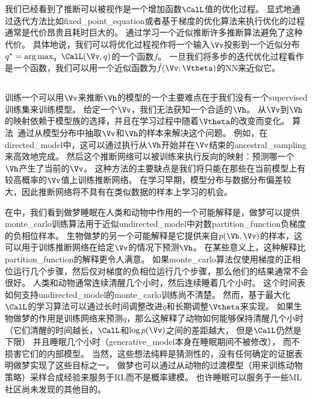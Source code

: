 \section{}
\label{sec:learned_approximate_inference}

我们已经看到了推断可以被视作是一个增加函数$\CalL$值的优化过程。
显式地通过迭代方法比如\gls{fixed_point_equation}或者基于梯度的优化算法来执行优化的过程通常是代价昂贵且耗时巨大的。
通过学习一个近似推断许多推断算法避免了这种代价。
具体地说，我们可以将优化过程视作将一个输入$\Vv$投影到一个近似分布$q^* = \arg\max_q\  \CalL(\Vv,q)$的一个函数$f$。
一旦我们将多步的迭代优化过程看作是一个函数，我们可以用一个近似函数为$\hat{f}(\Vv;{\Vtheta})$的\gls{NN}来近似它。


\subsection{}
\label{sec:wake_sleep}

训练一个可以用$\Vv$来推断$\Vh$的模型的一个主要难点在于我们没有一个\gls{supervised}训练集来训练模型。
给定一个$\Vv$，我们无法获知一个合适的$\Vh$。
从$\Vv$到$\Vh$的映射依赖于模型族的选择，并且在学习过程中随着${\Vtheta}$的改变而变化。
算法~\citep{Hinton95,Frey96}通过从模型分布中抽取$\Vv$和$\Vh$的样本来解决这个问题。
例如，在\gls{directed_model}中，这可以通过执行从$\Vh$开始并在$\Vv$结束的\gls{ancestral_sampling}来高效地完成。
然后这个推断网络可以被训练来执行反向的映射：预测哪一个$\Vh$产生了当前的$\Vv$。
这种方法的主要缺点是我们将只能在那些在当前模型上有较高概率的$\Vv$值上训练推断网络。
在学习早期，模型分布与数据分布偏差较大，因此推断网络将不具有在类似数据的样本上学习的机会。


在中，我们看到做梦睡眠在人类和动物中作用的一个可能解释是，做梦可以提供\gls{monte_carlo}训练算法用于近似\gls{undirected_model}中对数\gls{partition_function}负梯度的负相位样本。
生物做梦的另一个可能解释是它提供来自$p(\Vh,\Vv)$的样本，这可以用于训练推断网络在给定$\Vv$的情况下预测$\Vh$。
在某些意义上，这种解释比\gls{partition_function}的解释更令人满意。
如果\gls{monte_carlo}算法仅使用梯度的正相位运行几个步骤，然后仅对梯度的负相位运行几个步骤，那么他们的结果通常不会很好。
人类和动物通常连续清醒几个小时，然后连续睡着几个小时。
这个时间表如何支持\gls{undirected_model}的\gls{monte_carlo}训练尚不清楚。
然而，基于最大化$\CalL$的学习算法可以通过长时间调整改进$q$和长期调整${\Vtheta}$来实现。
如果生物做梦的作用是训练网络来预测$q$，那么这解释了动物如何能够保持清醒几个小时
（它们清醒的时间越长，$\CalL$和$\log p(\Vv)$之间的差距越大， 但是$\CalL$仍然是下限）
并且睡眠几个小时（\gls{generative_model}本身在睡眠期间不被修改）， 而不损害它们的内部模型。
当然，这些想法纯粹是猜测性的，没有任何确定的证据表明做梦实现了这些目标之一。
做梦也可以通过从动物的过渡模型（用来训练动物策略）采样合成经验来服务于\gls{RL}而不是概率建模。
也许睡眠可以服务于一些\gls{ML}社区尚未发现的其他目的。



